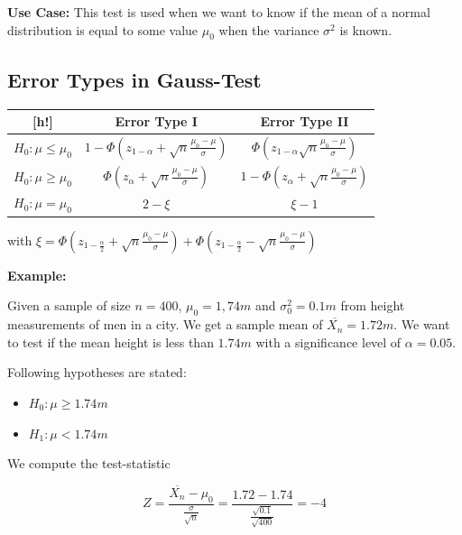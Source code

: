 \textbf{Use Case:} This test is used when we want to know if the mean of a normal distribution is equal to some value \(\mu_0\) 
when the variance \(\sigma^2\) is known.

\subsection{Error Types in Gauss-Test}

\begin{center}
    \begin{tabular}{c|c|c}[h!]
                & Error Type I          & Error Type II        \\ \hline
    \(H_0: \mu \le \mu_0\)   & \(1 - \Phi\left(z_{1  -\alpha} + \sqrt{n}\frac{\mu_0 - \mu}{\sigma}\right)\)     & \(\Phi\left(z_{1  -\alpha}\sqrt{n}\frac{\mu_0 - \mu}{\sigma}\right)\)          \\ \hline
    \(H_0: \mu \ge \mu_0\) & \(\Phi\left(z_{\alpha} + \sqrt{n}\frac{\mu_0 - \mu}{\sigma}\right)\) & \(1 - \Phi\left(z_{\alpha} + \sqrt{n}\frac{\mu_0 - \mu}{\sigma}\right)\) \\ \hline
    \(H_0: \mu = \mu_0\) & \(2 - \xi\)& \(\xi - 1\)
    \end{tabular}
\end{center}

with \(\xi = \Phi\left(z_{1 - \frac{\alpha}{2}} + \sqrt{n}\frac{\mu_0 - \mu}{\sigma}\right) + \Phi\left(z_{1 - \frac{\alpha}{2}} - \sqrt{n}\frac{\mu_0 - \mu}{\sigma}\right)\)

\textbf{Example:}

Given a sample of size \(n = 400\), \(\mu_0 = 1,74m \) and \(\sigma_0^2 = 0.1m\) from height measurements of men in a city. 
We get a sample mean of \(\overline{X_n} = 1.72m\). We want to test if the mean height is less than \(1.74m\) with a significance level of \(\alpha = 0.05\). 

Following hypotheses are stated:

\begin{itemize}

    \item \(H_0: \mu \ge 1.74m\)

    \item \(H_1: \mu < 1.74m\)  

\end{itemize}

We compute the test-statistic

\[
    Z = \frac{\overline{X_n} - \mu_0}{\frac{\sigma}{\sqrt{n}}} = \frac{1.72 - 1.74}{\frac{\sqrt{0.1}}{\sqrt{400}}} = -4
\]

